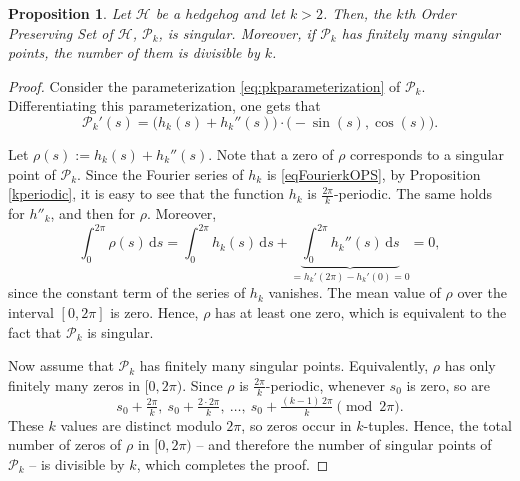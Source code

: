 \documentclass{amsart}
\newtheorem{prop}[thm]{Proposition}
\theoremstyle{definition}
\numberwithin{equation}{section}
\renewcommand{\d}{\mathrm{d}}
\begin{document}
\begin{prop}\label{singularitiesofT}
  Let $\mathcal{H}$ be a hedgehog and let $k>2$. Then, the $k$th Order Preserving Set of $\mathcal{H}$, $\mathcal{P}_k$, is singular. Moreover, if $\mathcal{P}_k$ has finitely many singular points, the number of them is divisible by $k$.
\end{prop}
\begin{proof}
    Consider the parameterization \eqref{eq:pkparameterization} of $\mathcal{P}_k$. Differentiating this parameterization, one gets that
    $$\mathcal{P}_k'(s)= \Big(h_k(s) + h_k''(s)\Big)\cdot\Big(-\sin(s),\cos(s)\Big).$$

    Let $\rho(s):=h_k(s)+h_k''(s)$. Note that a zero of $\rho$ corresponds to a singular point of $\mathcal{P}_k$. Since the Fourier series of $h_k$ is \eqref{eqFourierkOPS}, by Proposition \ref{kperiodic}, it is easy to see that the function $h_k$ is $\frac{2\pi}{k}$-periodic. The same holds for $h''_k$, and then for $\rho$. Moreover,
    $$\int_0^{2\pi} \rho(s)\,\d s
  =\int_0^{2\pi} h_k(s)\,\d s
   +\underbrace{\int_0^{2\pi} h_k''(s)\,\d s}_{=h_k'(2\pi)-h_k'(0)=0}
  =0,$$
    since the constant term of the series of $h_k$ vanishes. The mean value of $\rho$ over the interval $[0,2\pi]$ is zero. Hence, $\rho$ has at least one zero, which is equivalent to the fact that $\mathcal{P}_k$ is singular.

    Now assume that $\mathcal P_k$ has finitely many singular points. Equivalently, $\rho$ has only finitely many zeros in $[0,2\pi)$. Since $\rho$ is $\frac{2\pi}{k}$-periodic, whenever $s_0$ is zero, so are 
    $$
    s_0+\tfrac{2\pi}{k},\ s_0+\tfrac{2\cdot 2\pi}{k},\ \ldots,\
    s_0+\tfrac{(k-1)\,2\pi}{k}\pmod{2\pi}.
    $$
    These $k$ values are distinct modulo $2\pi$, so zeros occur in $k$-tuples. Hence, the total number of zeros of $\rho$ in $[0,2\pi)$ -- and therefore the number of singular points of $\mathcal P_k$ -- is divisible by $k$, which completes the proof.
    \end{proof}
\end{document}
